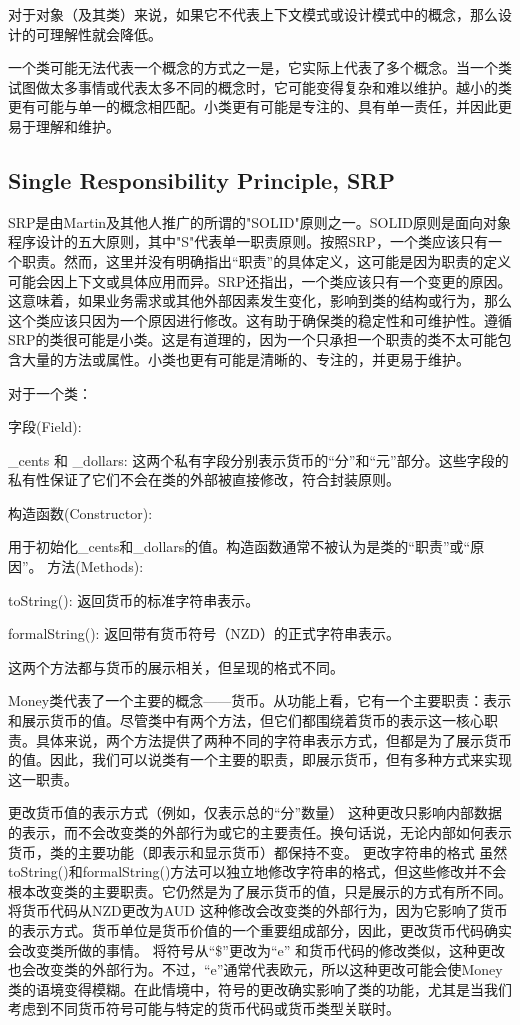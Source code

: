 对于对象（及其类）来说，如果它不代表上下文模式或设计模式中的概念，那么设计的可理解性就会降低。

一个类可能无法代表一个概念的方式之一是，它实际上代表了多个概念。当一个类试图做太多事情或代表太多不同的概念时，它可能变得复杂和难以维护。越小的类更有可能与单一的概念相匹配。小类更有可能是专注的、具有单一责任，并因此更易于理解和维护。

\subsection{Single Responsibility Principle, SRP}
SRP是由Martin及其他人推广的所谓的"SOLID"原则之一。SOLID原则是面向对象程序设计的五大原则，其中"S"代表单一职责原则。按照SRP，一个类应该只有一个职责。然而，这里并没有明确指出“职责”的具体定义，这可能是因为职责的定义可能会因上下文或具体应用而异。SRP还指出，一个类应该只有一个变更的原因。这意味着，如果业务需求或其他外部因素发生变化，影响到类的结构或行为，那么这个类应该只因为一个原因进行修改。这有助于确保类的稳定性和可维护性。遵循SRP的类很可能是小类。这是有道理的，因为一个只承担一个职责的类不太可能包含大量的方法或属性。小类也更有可能是清晰的、专注的，并更易于维护。

对于一个类：

字段(Field):

\_cents 和 \_dollars: 这两个私有字段分别表示货币的“分”和“元”部分。这些字段的私有性保证了它们不会在类的外部被直接修改，符合封装原则。

构造函数(Constructor):

用于初始化\_cents和\_dollars的值。构造函数通常不被认为是类的“职责”或“原因”。
方法(Methods):

toString(): 返回货币的标准字符串表示。

formalString(): 返回带有货币符号（NZD）的正式字符串表示。

这两个方法都与货币的展示相关，但呈现的格式不同。

Money类代表了一个主要的概念——货币。从功能上看，它有一个主要职责：表示和展示货币的值。尽管类中有两个方法，但它们都围绕着货币的表示这一核心职责。具体来说，两个方法提供了两种不同的字符串表示方式，但都是为了展示货币的值。因此，我们可以说类有一个主要的职责，即展示货币，但有多种方式来实现这一职责。

更改货币值的表示方式（例如，仅表示总的“分”数量）
这种更改只影响内部数据的表示，而不会改变类的外部行为或它的主要责任。换句话说，无论内部如何表示货币，类的主要功能（即表示和显示货币）都保持不变。
更改字符串的格式
虽然toString()和formalString()方法可以独立地修改字符串的格式，但这些修改并不会根本改变类的主要职责。它仍然是为了展示货币的值，只是展示的方式有所不同。
将货币代码从NZD更改为AUD
这种修改会改变类的外部行为，因为它影响了货币的表示方式。货币单位是货币价值的一个重要组成部分，因此，更改货币代码确实会改变类所做的事情。
将符号从“\$”更改为“e”
和货币代码的修改类似，这种更改也会改变类的外部行为。不过，“e”通常代表欧元，所以这种更改可能会使Money类的语境变得模糊。在此情境中，符号的更改确实影响了类的功能，尤其是当我们考虑到不同货币符号可能与特定的货币代码或货币类型关联时。


